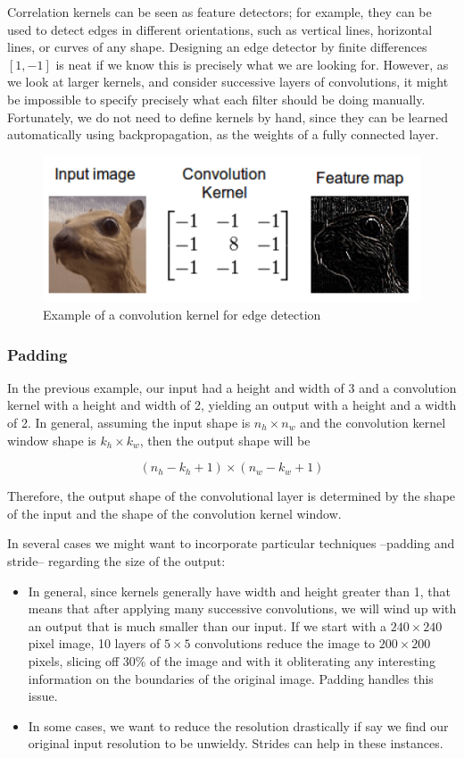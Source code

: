 Correlation kernels can be seen as feature detectors; for example, they can be used to detect edges in different orientations, such as vertical lines, horizontal lines, or curves of any shape. Designing an edge detector by finite differences $[1, -1]$ is neat if we know this is precisely what we are looking for. However, as we look at larger kernels, and consider successive layers of convolutions, it might be impossible to specify precisely what each filter should be doing manually. Fortunately, we do not need to define kernels by hand, since they can be learned automatically using backpropagation, as the weights of a fully connected layer.

\begin{figure}[hpt]
	\centering
	\includegraphics[scale=0.5]{images/ch3/edge-detection.png}
	\caption{Example of a convolution kernel for edge detection}
	\label{fig:edge-detection}
\end{figure}

\subsubsection{Padding}

In the previous example, our input had a height and width of 3 and a convolution kernel with a height and width of 2, yielding an output with a height and a width of 2. In general, assuming the input shape is  $n_h \times n_w$  and the convolution kernel window shape is $k_h \times k_w$, then the output shape will be

$$(n_h-k_h+1) \times (n_w-k_w+1)$$
 
Therefore, the output shape of the convolutional layer is determined by the shape of the input and the shape of the convolution kernel window.

In several cases we might want to incorporate particular techniques --padding and stride-- regarding the size of the output:
\begin{itemize}
    \item In general, since kernels generally have width and height greater than 1, that means that after applying many successive convolutions, we will wind up with an output that is much smaller than our input. If we start with a $240\times240$ pixel image, 10 layers of $5\times5$ convolutions reduce the image to $200\times200$ pixels, slicing off 30\% of the image and with it obliterating any interesting information on the boundaries of the original image. Padding handles this issue.
    \item In some cases, we want to reduce the resolution drastically if say we find our original input resolution to be unwieldy. Strides can help in these instances.
\end{itemize}

